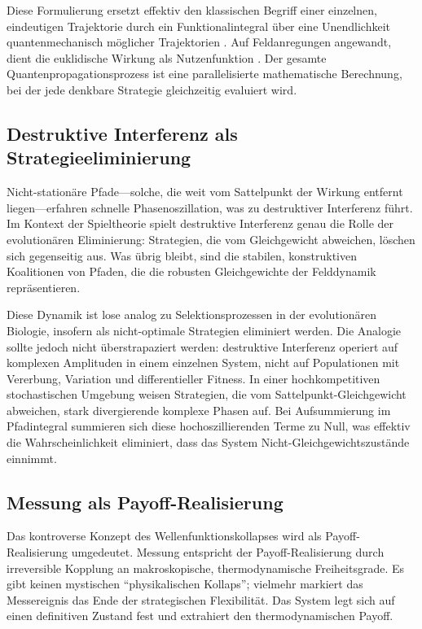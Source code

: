 \documentclass[12pt,a4paper]{article}
\theoremstyle{remark}
\begin{document}
Diese Formulierung ersetzt effektiv den klassischen Begriff einer einzelnen, eindeutigen Trajektorie durch ein Funktionalintegral \"uber eine Unendlichkeit quantenmechanisch m\"oglicher Trajektorien \citep{PathIntegral}. Auf Feldanregungen angewandt, dient die euklidische Wirkung als Nutzenfunktion \citep{PathIntegralOptimization}. Der gesamte Quantenpropagationsprozess ist eine parallelisierte mathematische Berechnung, bei der jede denkbare Strategie gleichzeitig evaluiert wird.

\subsection{Destruktive Interferenz als Strategieeliminierung}

Nicht-station\"are Pfade---solche, die weit vom Sattelpunkt der Wirkung entfernt liegen---erfahren schnelle Phasenoszillation, was zu destruktiver Interferenz f\"uhrt. Im Kontext der Spieltheorie spielt destruktive Interferenz genau die Rolle der evolution\"aren Eliminierung: Strategien, die vom Gleichgewicht abweichen, l\"oschen sich gegenseitig aus. Was \"ubrig bleibt, sind die stabilen, konstruktiven Koalitionen von Pfaden, die die robusten Gleichgewichte der Felddynamik repr\"asentieren.

Diese Dynamik ist lose analog zu Selektionsprozessen in der evolution\"aren Biologie, insofern als nicht-optimale Strategien eliminiert werden. Die Analogie sollte jedoch nicht \"uberstrapaziert werden: destruktive Interferenz operiert auf komplexen Amplituden in einem einzelnen System, nicht auf Populationen mit Vererbung, Variation und differentieller Fitness. In einer hochkompetitiven stochastischen Umgebung weisen Strategien, die vom Sattelpunkt-Gleichgewicht abweichen, stark divergierende komplexe Phasen auf. Bei Aufsummierung im Pfadintegral summieren sich diese hochoszillierenden Terme zu Null, was effektiv die Wahrscheinlichkeit eliminiert, dass das System Nicht-Gleichgewichtszust\"ande einnimmt.

\subsection{Messung als Payoff-Realisierung}

Das kontroverse Konzept des Wellenfunktionskollapses wird als Payoff-Realisierung umgedeutet. Messung entspricht der Payoff-Realisierung durch irreversible Kopplung an makroskopische, thermodynamische Freiheitsgrade. Es gibt keinen mystischen ``physikalischen Kollaps''; vielmehr markiert das Messereignis das Ende der strategischen Flexibilit\"at. Das System legt sich auf einen definitiven Zustand fest und extrahiert den thermodynamischen Payoff.
\end{document}
